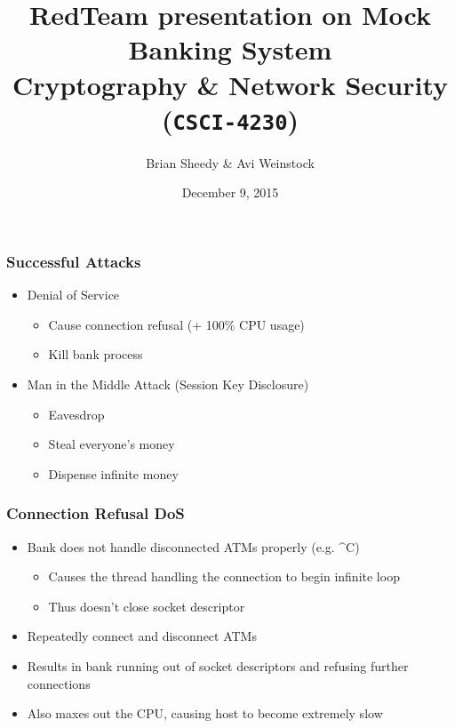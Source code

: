 \documentclass{beamer}
\title{RedTeam presentation on Mock Banking System\\Cryptography \& Network Security (\Verb|CSCI-4230|)}
\date{December 9, 2015}
\author{Brian Sheedy \& Avi Weinstock}
\begin{document}
\maketitle

\begin{frame}[fragile]
\frametitle{Successful Attacks}
\begin{itemize}
\item Denial of Service
\begin{itemize}
\item Cause connection refusal (+ 100\% CPU usage)
\item Kill bank process
\end{itemize}
\item Man in the Middle Attack (Session Key Disclosure)
\begin{itemize}
\item Eavesdrop
\item Steal everyone's money
\item Dispense infinite money
\end{itemize}
\end{itemize}
\end{frame}

\begin{frame}[fragile]
\frametitle{Connection Refusal DoS}
\begin{itemize}
\item Bank does not handle disconnected ATMs properly (e.g. \^{}C)
\begin{itemize}
\item Causes the thread handling the connection to begin infinite loop
\item Thus doesn't close socket descriptor
\end{itemize}
\item Repeatedly connect and disconnect ATMs
\item Results in bank running out of socket descriptors and refusing further connections
\item Also maxes out the CPU, causing host to become extremely slow
\end{itemize}
\end{frame}
\end{document}
